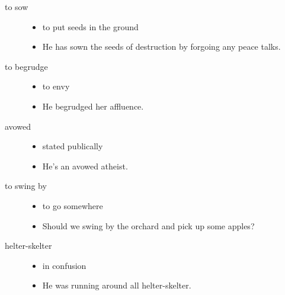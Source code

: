 \documentclass[a4paper]{article}
\begin{document}
\begin{description}
    \item[to sow] \begin{itemize}
        \item to put seeds in the ground
        \item He has sown the seeds of destruction by forgoing any peace talks.
    \end{itemize}
    \item[to begrudge] \begin{itemize}
        \item to envy
        \item He begrudged her affluence.
    \end{itemize}
    \item[avowed] \begin{itemize}
        \item stated publically
        \item He's an avowed atheist.
    \end{itemize}
    \item[to swing by] \begin{itemize}
        \item to go somewhere
        \item Should we swing by the orchard and pick up some apples?
    \end{itemize}
    \item[helter-skelter] \begin{itemize}
        \item in confusion
        \item He was running around all helter-skelter.
    \end{itemize}
\end{description}
\end{document}
